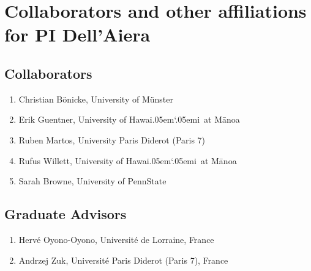 \documentclass[11pt]{article}
\newcommand{\Manoa}{M\=anoa}
\newcommand{\Hawaii}{Hawai\kern.05em`\kern.05em\relax i}
\begin{document}
\section*{Collaborators and other affiliations for PI Dell'Aiera}

\subsection*{Collaborators}

\begin{enumerate}
\item Christian B\"onicke, University of M\"{u}nster
\item Erik Guentner, University of \Hawaii~at \Manoa 
\item Ruben Martos, University Paris Diderot (Paris 7)
\item Rufus Willett, University of \Hawaii~at \Manoa
\item Sarah Browne, University of PennState
\end{enumerate}

\subsection*{Graduate Advisors}

\begin{enumerate}
\item Herv\'e Oyono-Oyono, Universit\'e de Lorraine, France
\item Andrzej Zuk, Universit\'e Paris Diderot (Paris 7), France
\end{enumerate}
\end{document}
